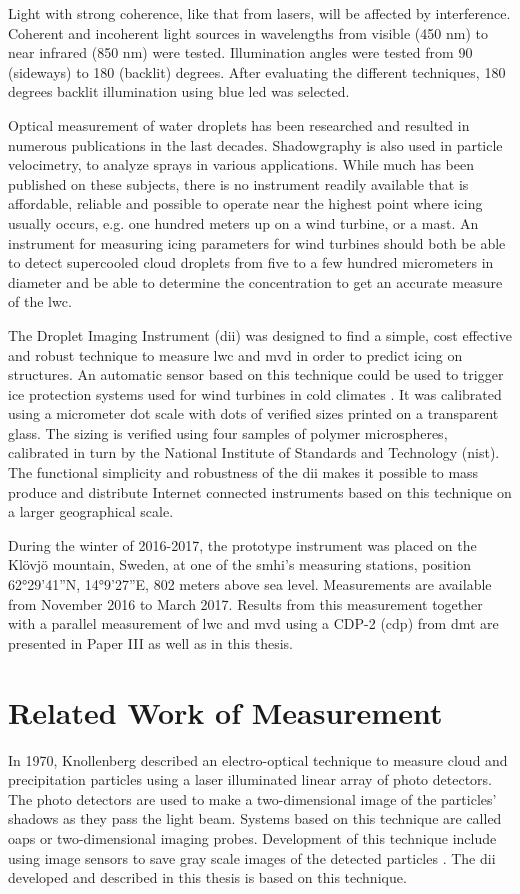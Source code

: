Light with strong coherence, like that from lasers, will be affected by interference. Coherent and incoherent light sources in wavelengths from visible (450 nm) to near infrared (850 nm) were tested. Illumination angles were tested from 90 (sideways) to 180 (backlit) degrees. After evaluating the different techniques, 180 degrees backlit illumination using blue \gls{led} was selected.

Optical measurement of water droplets has been researched and resulted in numerous publications in the last decades. Shadowgraphy is also used in particle velocimetry, to analyze sprays in various applications. While much has been published on these subjects, there is no instrument readily available that is affordable, reliable and possible to operate near the highest point where icing usually occurs, e.g. one hundred meters up on a wind turbine, or a mast. An instrument for measuring icing parameters for wind turbines should both be able to detect supercooled cloud droplets from five to a few hundred micrometers in diameter and be able to determine the concentration to get an accurate measure of the \gls{lwc}.

The Droplet Imaging Instrument (\gls{dii}) was designed to find a simple, cost effective and robust technique to measure \gls{lwc} and \gls{mvd} in order to predict icing on structures. An automatic sensor based on this technique could be used to trigger ice protection systems used for wind turbines in cold climates \cite{lamra2013}. It was calibrated using a micrometer dot scale with dots of verified sizes printed on a transparent glass. The sizing is verified using four samples of polymer microspheres, calibrated in turn by the National Institute of Standards and Technology (\gls{nist}). The functional simplicity and robustness of the \gls{dii} makes it possible to mass produce and distribute Internet connected instruments based on this technique on a larger geographical scale.

During the winter of 2016-2017, the prototype instrument was placed on the Klövjö mountain, Sweden, at one of the \gls{smhi}'s measuring stations, position 62°29'41''N, 14°9'27''E, 802 meters above sea level. Measurements are available from November 2016 to March 2017. Results from this measurement together with a parallel measurement of \gls{lwc} and \gls{mvd} using a CDP-2 (\gls{cdp}) from \gls{dmt} are presented in Paper III as well as in this thesis.

\section{Related Work of Measurement}
\label{sec:relwork}
In 1970, Knollenberg \cite{knoll1970} described an electro-optical technique to measure cloud and precipitation particles using a laser illuminated linear array of photo detectors. The photo detectors are used to make a two-dimensional image of the particles’ shadows as they pass the light beam. Systems based on this technique are called \gls{oap}s or two-dimensional imaging probes. Development of this technique include using image sensors to save gray scale images of the detected particles \cite{kulk2011,wend2013}. The \gls{dii} developed and described in this thesis is based on this technique.

